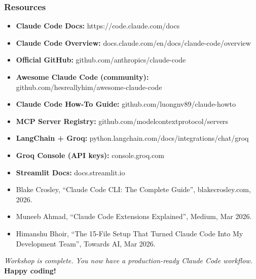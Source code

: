\begin{frame}[fragile]\frametitle{Resources}
  \begin{itemize}
    \item \textbf{Claude Code Docs:} https://code.claude.com/docs
    \item \textbf{Claude Code Overview:} docs.claude.com/en/docs/claude-code/overview
    \item \textbf{Official GitHub:} github.com/anthropics/claude-code
    \item \textbf{Awesome Claude Code (community):} github.com/hesreallyhim/awesome-claude-code
    \item \textbf{Claude Code How-To Guide:} github.com/luongnv89/claude-howto
    \item \textbf{MCP Server Registry:} github.com/modelcontextprotocol/servers
    \item \textbf{LangChain + Groq:} python.langchain.com/docs/integrations/chat/groq
    \item \textbf{Groq Console (API keys):} console.groq.com
    \item \textbf{Streamlit Docs:} docs.streamlit.io
    \item Blake Crosley, ``Claude Code CLI: The Complete Guide'', blakecrosley.com, 2026.
    \item Muneeb Ahmad, ``Claude Code Extensions Explained'', Medium, Mar 2026.
    \item Himanshu Bhoir, ``The 15-File Setup That Turned Claude Code Into My Development Team'', Towards AI, Mar 2026.
  \end{itemize}

\begin{center}
\textit{Workshop is complete. You now have a production-ready Claude Code workflow.}\\[0.5em]
\textbf{Happy coding!}
\end{center}
\end{frame}